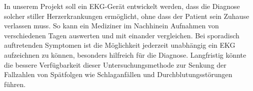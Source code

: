 In unserem Projekt soll ein EKG-Gerät entwickelt werden, dass die Diagnose solcher stiller Herzerkrankungen ermöglicht, ohne dass der Patient sein Zuhause verlassen muss. So kann ein Mediziner im Nachhinein Aufnahmen von verschiedenen Tagen auswerten und mit einander vergleichen. Bei sporadisch auftretenden Symptomen ist die Möglichkeit jederzeit unabhängig ein EKG aufzeichnen zu können, besonders hilfreich für die Diagnose. Langfristig könnte die bessere Verfügbarkeit dieser Untersuchungsmethode zur Senkung der Fallzahlen von Spätfolgen wie Schlaganfällen und Durchblutungsstörungen führen. 






